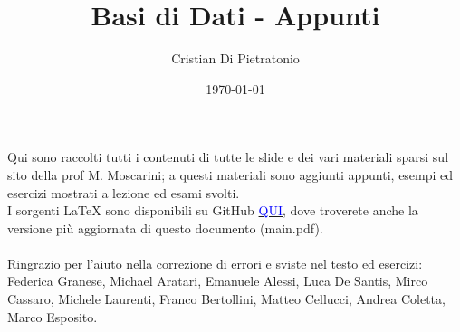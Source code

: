 \documentclass[a4paper,10pt]{article}
\title{\Huge Basi di Dati - Appunti}
\author{Cristian Di Pietratonio}
\date{\today}
\begin{document}
\maketitle

Qui sono raccolti tutti i contenuti di tutte le slide e dei vari materiali sparsi sul sito della 
prof M. Moscarini; a questi materiali sono aggiunti appunti, esempi ed esercizi mostrati a lezione
ed esami svolti.\\ 
I sorgenti LaTeX sono disponibili su GitHub 
\href{https://github.com/Halolegend94/uni_database_appunti}{\textcolor{blue}{QUI}}, dove troverete 
anche la versione più aggiornata di questo documento (main.pdf).\\\\

Ringrazio per l'aiuto nella correzione di errori e sviste nel testo ed esercizi: Federica Granese, 
Michael Aratari, Emanuele Alessi, Luca De Santis, Mirco Cassaro, Michele Laurenti, Franco Bertollini,
Matteo Cellucci, Andrea Coletta, Marco Esposito.



\newpage
\setcounter{tocdepth}{3}
\tableofcontents
\newpage

\newpage

\newpage

\newpage

\newpage

\newpage

\newpage

\end{document}

